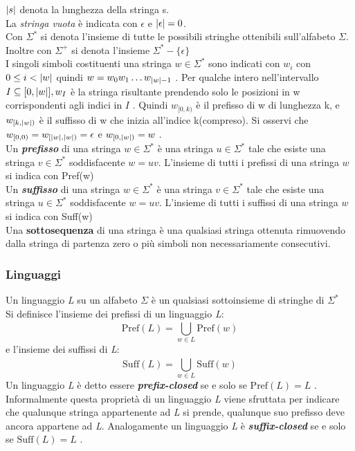 $\lvert s\rvert$ denota la lunghezza  della stringa s.\\
La \textit{stringa vuota} è indicata con $\epsilon$ e $\lvert\epsilon\rvert = 0$. \\
Con $\Sigma^{*}$ si denota l'insieme di tutte le possibili stringhe ottenibili sull'alfabeto $\Sigma$. Inoltre con $\Sigma^{+}$ si denota l'insieme $\Sigma^{*} - \{\epsilon\}$ \\
I singoli simboli costituenti una stringa $w \in \Sigma^{*}$ sono indicati con $w_i$ con $0 \leq i < \lvert w\rvert$ quindi $w = w_0 w_1 \dots w_{\lvert w\rvert-1}$ . Per qualche intero nell'intervallo $I \subseteq [0,\lvert w\rvert], w_I$ è la stringa risultante prendendo solo le posizioni in w corrispondenti agli indici in $I$ . Quindi $w_{[0,k)}$ è il prefisso di w di lunghezza k, e $w_{[k,\lvert w\rvert)}$ è il suffisso di w che inizia all'indice k(compreso). Si osservi che $w_{[0,0)} = w_{[\lvert w\rvert,\lvert w\rvert)} = \epsilon$ e $w_{[0,\lvert w\rvert)} = w$ .\\
Un \textbf{\textit{prefisso}}  di una stringa $w \in \Sigma^{*}$ è una stringa $u \in \Sigma^{*}$ tale che esiste una stringa $v \in \Sigma^{*}$ soddisfacente $w=uv$. L'insieme di tutti i prefissi di una stringa $w$ si indica con Pref(w)\\
Un \textbf{\textit{suffisso}}  di una stringa $w \in \Sigma^{*}$ è una stringa $v \in \Sigma^{*}$ tale che esiste una stringa $u \in \Sigma^{*}$ soddisfacente $w=uv$. L'insieme di tutti i suffissi di una stringa $w$ si indica con Suff(w)\\
Una \textbf{sottosequenza} di una stringa è una qualsiasi stringa ottenuta rimuovendo dalla stringa di partenza zero o più simboli non necessariamente consecutivi.
\subsubsection{Linguaggi}
Un linguaggio \textit{L} su un alfabeto $\Sigma$ è un qualsiasi sottoinsieme di stringhe di $\Sigma^{*}$\\ 
Si definisce l'insieme dei prefissi di un linguaggio \textit{L}:
\begin{equation*}
 \text{Pref}(L) = \bigcup_{w \in L}^{}{\text{Pref}(w)}
 \end{equation*}
e l'insieme dei suffissi di \textit{L}:
\begin{equation*}
 \text{Suff}(L) = \bigcup_{w \in L}^{}{\text{Suff}(w)}
 \end{equation*}
 Un linguaggio \textit{L} è detto essere \textbf{\textit{prefix-closed}} se e solo se $\text{Pref}(L) = L$ . Informalmente questa proprietà di un linguaggio \textit{L} viene sfruttata per indicare che qualunque stringa appartenente ad \textit{L} si prende, qualunque suo prefisso deve ancora appartene ad \textit{L}. Analogamente un linguaggio \textit{L} è \textbf{\textit{suffix-closed}} se e solo se $\text{Suff}(L) = L$ . \\
 
